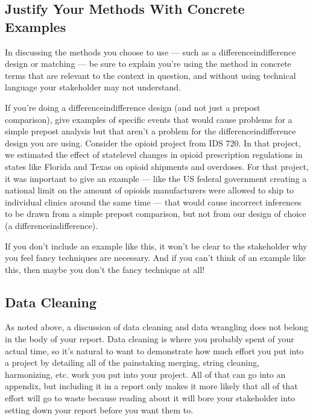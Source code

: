 \documentclass[letterpaper,10pt,english]{jupyterBook}
\begin{document}
\subsection{Justify Your Methods With Concrete Examples}
\label{\detokenize{40_in_practice/25_writing_to_stakeholders:justify-your-methods-with-concrete-examples}}
\sphinxAtStartPar
In discussing the methods you choose to use — such as a difference\sphinxhyphen{}in\sphinxhyphen{}difference design or matching — be sure to explain  you’re using the method in concrete terms that are relevant to the context in question, and without using technical language your stakeholder may not understand.

\sphinxAtStartPar
If you’re doing a difference\sphinxhyphen{}in\sphinxhyphen{}difference design (and not just a pre\sphinxhyphen{}post comparison), give examples of specific events that would cause problems for a simple pre\sphinxhyphen{}post analysis but that aren’t a problem for the difference\sphinxhyphen{}in\sphinxhyphen{}difference design you are using. Consider the opioid project from IDS 720. In that project, we estimated the effect of state\sphinxhyphen{}level changes in opioid prescription regulations in states like Florida and Texas on opioid shipments and overdoses. For that project, it was important to give an example — like the US federal government creating a national limit on the amount of opioids manufacturers were allowed to ship to individual clinics around the same time — that would cause incorrect inferences to be drawn from a simple pre\sphinxhyphen{}post comparison, but not from our design of choice (a difference\sphinxhyphen{}in\sphinxhyphen{}difference).

\sphinxAtStartPar
If you don’t include an example like this, it won’t be clear to the stakeholder why you feel fancy techniques are necessary. And if you can’t think of an example like this, then maybe you don’t  the fancy technique at all!


\subsection{Data Cleaning}
\label{\detokenize{40_in_practice/25_writing_to_stakeholders:data-cleaning}}
\sphinxAtStartPar
As noted above, a discussion of data cleaning and data wrangling does not belong in the body of your report. Data cleaning is where you probably spent  of your actual time, so it’s natural to want to demonstrate how much effort you put into a project by detailing all of the painstaking merging, string cleaning, harmonizing, etc. work you put into your project. All of that can go into an appendix, but including it in a report only makes it more likely that all of that effort will go to waste because reading about it will bore your stakeholder into setting down your report before you want them to.
\end{document}

